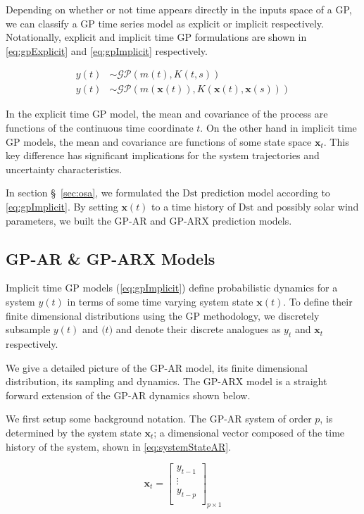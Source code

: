 Depending on whether or not time appears directly in the inputs space of a GP, we can classify a GP time series model as explicit or 
implicit respectively. Notationally, explicit and implicit time GP formulations are shown in \cref{eq:gpExplicit} 
and \cref{eq:gpImplicit} respectively.

\begin{align}
    y(t) &\sim \mathcal{GP}(m(t), K(t, s)) \label{eq:gpExplicit}\\
    y(t) &\sim \mathcal{GP}(m(\mathbf{x}(t)), K(\mathbf{x}(t), \mathbf{x}(s))) \label{eq:gpImplicit}
\end{align}

In the explicit time GP model, the mean and covariance of the process are functions of the continuous time 
coordinate $t$. On the other hand in implicit time GP models, the mean and covariance are functions of some 
state space $\mathbf{x}_t$. This key difference has significant implications for the system trajectories and 
uncertainty characteristics.

In section \S~\ref{sec:osa}, we formulated the $\mathrm{Dst}$ prediction model according to \cref{eq:gpImplicit}. 
By setting $\mathbf{x}(t)$ to a time history of $\mathrm{Dst}$ and possibly solar wind parameters, we built the 
GP-AR and GP-ARX prediction models.


\subsection*{GP-AR \& GP-ARX Models}

Implicit time GP models (\cref{eq:gpImplicit}) define probabilistic dynamics for a system $y(t)$ in terms
of some time varying system state $\mathbf{x}(t)$. To define their finite dimensional distributions using the GP methodology, we 
discretely subsample $y(t)$ and $\mathbf(t)$ and denote their discrete analogues as $y_t$ and $\mathbf{x}_t$ respectively.  

We give a detailed picture of the GP-AR model, its finite dimensional distribution, its sampling and dynamics. The GP-ARX model 
is a straight forward extension of the GP-AR dynamics shown below.

We first setup some background notation. The GP-AR system of order $p$, is determined by the system state 
$\mathbf{x}_t$; a dimensional vector composed of the time history of the system, shown in \cref{eq:systemStateAR}.

\begin{equation}\label{eq:systemStateAR}
    \mathbf{x}_t = \begin{bmatrix}
        y_{t-1}\\ 
        \vdots\\ 
        y_{t-p}\\ 
        \end{bmatrix}_{p \times 1}
\end{equation}

